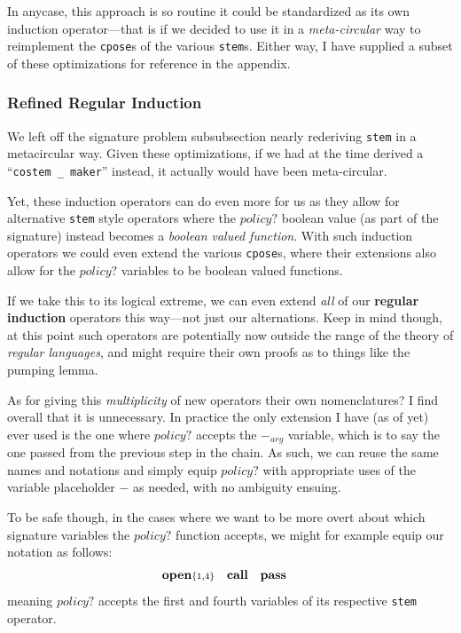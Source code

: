 \documentclass[twoside]{article}
\newcommand{\strong}[1]{{\bfseries #1}}
\newcommand{\bfmbox}[1]{\mbox{\bfseries #1}}
\begin{document}
In anycase, this approach is so routine it could be standardized as its own induction operator---that is if we
decided to use it in a \emph{meta-circular} way to reimplement the \texttt{cpose}s of the various \texttt{stem}s.
Either way, I have supplied a subset of these optimizations for reference in the appendix.

\subsubsection*{Refined Regular Induction}

We left off the signature problem subsubsection nearly rederiving \texttt{stem} in a metacircular way. Given these optimizations,
if we had at the time derived a ``\texttt{costem\,\_\,maker}'' instead, it actually would have been meta-circular.

Yet, these induction operators can do even more for us as they allow for alternative \texttt{stem} style operators
where the $ policy? $ boolean value (as part of the signature) instead becomes a \emph{boolean valued function}.
With such induction operators we could even extend the various \texttt{cpose}s, where their extensions also
allow for the $ policy? $ variables to be boolean valued functions.

If we take this to its logical extreme, we can even extend \emph{all} of our \strong{regular induction} operators this
way---not just our alternations. Keep in mind though, at this point such operators are potentially now outside the range
of the theory of \emph{regular languages}, and might require their own proofs as to things like the pumping lemma.

As for giving this \emph{multiplicity} of new operators their own nomenclatures? I find overall that it is unnecessary.
In practice the only extension I have (as of yet) ever used is the one where $ policy? $ accepts the $ -_{arg} $ variable,
which is to say the one passed from the previous step in the chain. As such, we can reuse the same names and notations
and simply equip $ policy? $ with appropriate uses of the variable placeholder $ - $ as needed, with no ambiguity ensuing.

To be safe though, in the cases where we want to be more overt about which signature variables the $ policy? $ function
accepts, we might for example equip our notation as follows:
$$ \bfmbox{open}{\scriptstyle \{1,4\}} \quad \bfmbox{call} \quad \bfmbox{pass} \quad $$
meaning $ policy? $ accepts the first and fourth variables of its respective \texttt{stem} operator.
\end{document}
